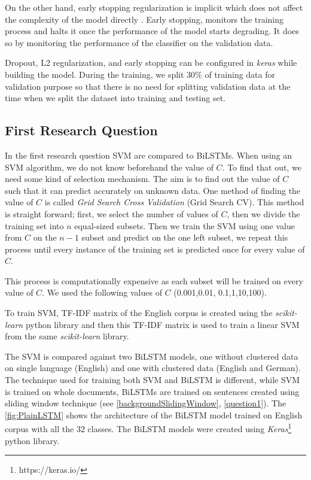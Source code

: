 On the other hand, early stopping regularization is implicit which does not affect the complexity of the model directly \cite{zhang2016understanding}. Early stopping, monitors the training process and halts it once the performance of the model starts degrading. It does so by monitoring the performance of the classifier on the validation data. 

Dropout, L2 regularization, and early stopping can be configured in \textit{keras} while building the model. During the training, we split 30\% of training data for validation purpose so that there is no need for splitting validation data at the time when we split the dataset into training and testing set.

\subsection{First Research Question} \label{impQuestion1}

In the first research question \gls{SVM} are compared to \glspl{BiLSTM}. When using an \gls{SVM} algorithm, we do not know beforehand the value of $C$. To find that out, we need some kind of selection mechanism. The aim is to find out the value of $C$ such that it can predict accurately on unknown data. One method of finding the value of $C$ is called \textit{Grid Search Cross Validation} (Grid Search CV). This method is straight forward; first, we select the number of values of $C$, then we divide the training set into $n$ equal-sized subsets. Then we train the \gls{SVM} using one value from $C$ on the $n-1$ subset and predict on the one left subset, we repeat this process until every instance of the training set is predicted once for every value of $C$.

This process is computationally expensive as each subset will be trained on every value of $C$. We used the following values of $C$ (0.001,0.01, 0.1,1,10,100).

To train \gls{SVM}, \gls{TF-IDF} matrix of the English corpus is created using the \textit{scikit-learn} python library and then this \gls{TF-IDF} matrix is used to train a linear \gls{SVM} from the same \textit{scikit-learn} library. 

The \gls{SVM} is compared against two \gls{BiLSTM} models, one without clustered data on single language (English) and one with clustered data (English and German). The technique used for training both \gls{SVM} and \gls{BiLSTM} is different, while \gls{SVM} is trained on whole documents, \glspl{BiLSTM} are trained on sentences created using sliding window technique (see \ref{backgroundSlidingWindow}, \ref{question1}). The \ref{fig:PlainLSTM} shows the architecture of the \gls{BiLSTM} model trained on English corpus with all the 32 classes. The \gls{BiLSTM} models were created using \textit{Keras}\footnote{https://keras.io/} python library. 

